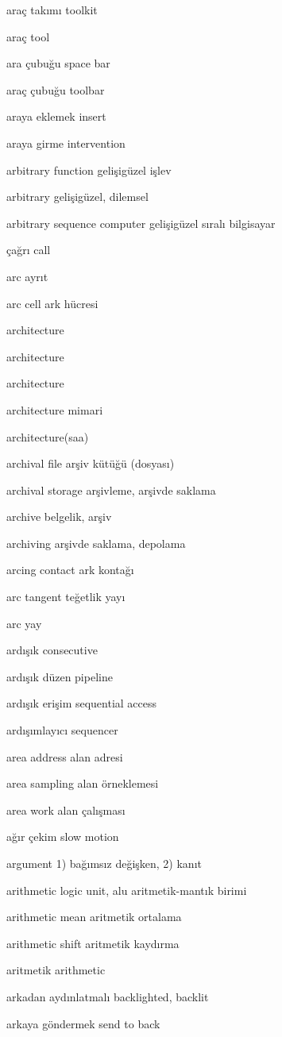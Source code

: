 \documentclass[12pt,fleqn]{article}\usepackage{../../common}
\begin{document}
araç takımı toolkit

araç tool

ara çubuğu space bar

araç çubuğu toolbar

araya eklemek insert

araya girme intervention

arbitrary function gelişigüzel işlev

arbitrary gelişigüzel, dilemsel

arbitrary sequence computer gelişigüzel sıralı bilgisayar

çağrı call

arc ayrıt

arc cell ark hücresi

architecture

architecture

architecture

architecture mimari

architecture(saa)

archival file arşiv kütüğü (dosyası)

archival storage arşivleme, arşivde saklama

archive belgelik, arşiv

archiving arşivde saklama, depolama

arcing contact ark kontağı

arc tangent teğetlik yayı

arc yay

ardışık consecutive

ardışık düzen pipeline

ardışık erişim sequential access

ardışımlayıcı sequencer

area address alan adresi

area sampling alan örneklemesi

area work alan çalışması

ağır çekim slow motion

argument 1) bağımsız değişken, 2) kanıt

arithmetic logic unit, alu aritmetik-mantık birimi

arithmetic mean aritmetik ortalama

arithmetic shift aritmetik kaydırma

aritmetik arithmetic

arkadan aydınlatmalı backlighted, backlit

arkaya göndermek send to back
\end{document}
